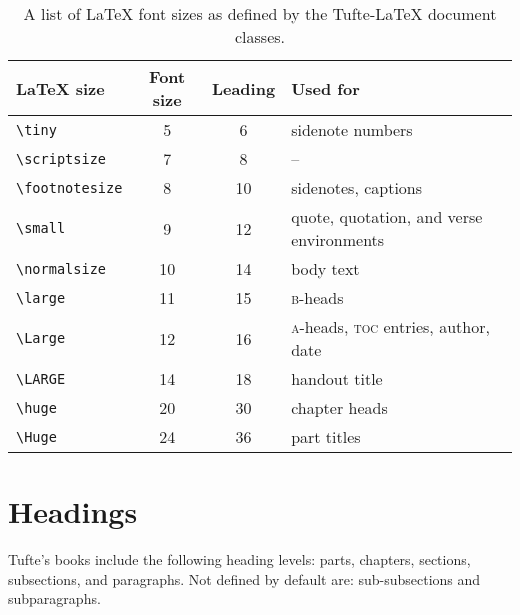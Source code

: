 \documentclass{tufte-book}
\newcommand{\TL}{Tufte-\LaTeX\xspace}
\newcommand{\na}{\quad--}%
\begin{document}
    \begin{table}[h]
      \footnotesize%
      \begin{center}
        \begin{tabular}{lccl}
          \toprule
          \LaTeX{} size & Font size & Leading & Used for \\
          \midrule
          \verb+\tiny+         &  5 &  6 & sidenote numbers \\
          \verb+\scriptsize+   &  7 &  8 & \na \\
          \verb+\footnotesize+ &  8 & 10 & sidenotes, captions \\
          \verb+\small+        &  9 & 12 & quote, quotation, and verse environments \\
          \verb+\normalsize+   & 10 & 14 & body text \\
          \verb+\large+        & 11 & 15 & \textsc{b}-heads \\
          \verb+\Large+        & 12 & 16 & \textsc{a}-heads, \textsc{toc} entries, author, date \\
          \verb+\LARGE+        & 14 & 18 & handout title \\
          \verb+\huge+         & 20 & 30 & chapter heads \\
          \verb+\Huge+         & 24 & 36 & part titles \\
          \bottomrule
        \end{tabular}
      \end{center}
      \caption{A list of \LaTeX{} font sizes as defined by the \TL document classes.}
      \label{tab:font-sizes}
    \end{table}
    
    \section{Headings}\label{sec:headings1}
    
    Tufte's books include the following heading levels: parts,
    chapters,  sections, subsections, and paragraphs.  Not defined by default
    are: sub-subsections and subparagraphs.
    
\end{document}
